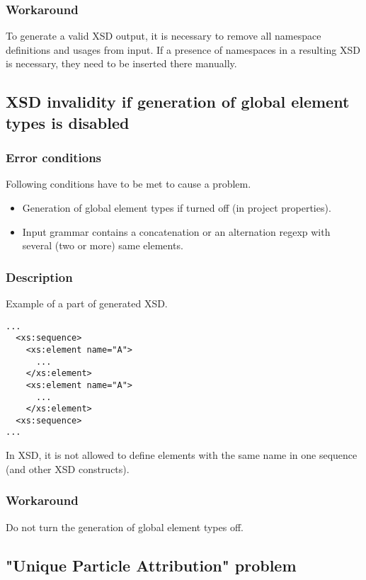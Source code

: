\documentclass[a4paper,10pt,oneside]{article}
\begin{document}
\subsubsection{Workaround}

To generate a valid XSD output, it is necessary to remove all namespace definitions and usages from input. If a presence of namespaces in a resulting XSD is necessary, they need to be inserted there manually.

\subsection{XSD invalidity if generation of global element types is disabled}

\subsubsection{Error conditions}

Following conditions have to be met to cause a problem.

\begin{itemize}
	\item Generation of global element types if turned off (in project properties).
	\item Input grammar contains a concatenation or an alternation regexp with several (two or more) same elements.
\end{itemize}

\subsubsection{Description}

Example of a part of generated XSD.

\begin{verbatim}
...
  <xs:sequence>
    <xs:element name="A">
      ...
    </xs:element>
    <xs:element name="A">
      ...
    </xs:element>
  <xs:sequence>
...
\end{verbatim}

In XSD, it is not allowed to define elements with the same name in one sequence (and other XSD constructs).

\subsubsection{Workaround}

Do not turn the generation of global element types off.

\subsection{"Unique Particle Attribution" problem}
\end{document}

